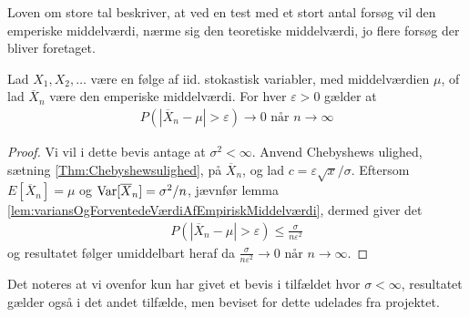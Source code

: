 Loven om store tal beskriver, at ved en test med et stort antal forsøg vil den emperiske middelværdi, nærme sig den teoretiske middelværdi, jo flere forsøg der bliver foretaget.
\begin{thm} \label{thm:law_of_large_numbers}%
    Lad $X_1, X_2, \dots$ være en følge af iid. stokastisk variabler, med middelværdien $\mu$, of lad $\overline{X}_{n}$ være den emperiske middelværdi. For hver $\varepsilon>0$ gælder at
    \begin{align*}
        P(|\overline{X}_{n}-\mu|>\varepsilon) \rightarrow 0 \text{ når } n \rightarrow \infty
    \end{align*}
\end{thm}
\begin{proof}
  Vi vil i dette bevis antage at $\sigma^{2} < \infty$. Anvend Chebyshews ulighed, sætning \ref{Thm:Chebyshewsulighed}, på $\overline{X}_{n}$, og lad $c=\varepsilon \sqrt{x}/\sigma$. Eftersom $E[\overline{X}_{n}]=\mu$ og $\textnormal{Var}[\overline{X}_{n}]=\sigma^2/n$, jævnfør lemma \ref{lem:variansOgForventedeVærdiAfEmpiriskMiddelværdi}, dermed giver det
    \begin{align*}
        P(|\overline{X}_{n}-\mu| > \varepsilon) \leq \frac{\sigma}{n\varepsilon^2}
    \end{align*}
  og resultatet følger umiddelbart heraf da $\frac{\sigma}{n\varepsilon^2} \rightarrow 0 \text{ når } n \rightarrow \infty.$
\end{proof}
\begin{remark}
  Det noteres at vi ovenfor kun har givet et bevis i tilfældet hvor $\sigma < \infty$, resultatet gælder også i det andet tilfælde, men beviset for dette udelades fra projektet.
\end{remark}
